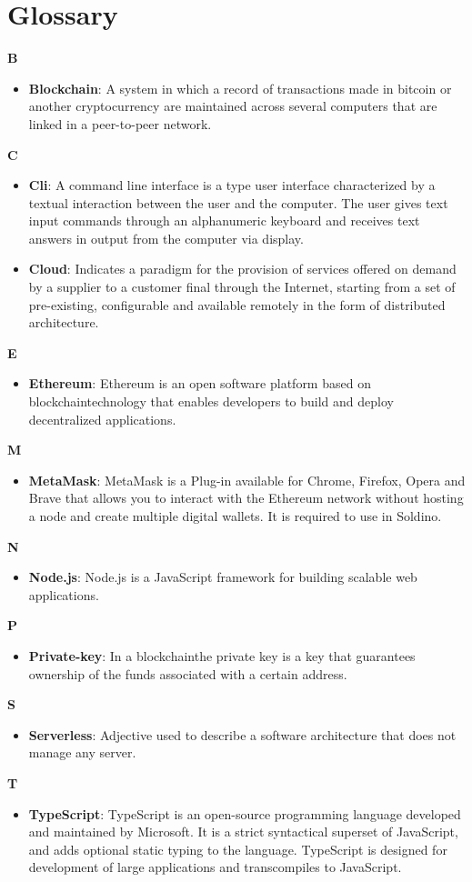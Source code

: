 \section{Glossary}
\textbf{B}
\begin{itemize}
	\item \textbf{Blockchain}: A system in which a record of transactions made in bitcoin or another cryptocurrency are maintained across several computers that are linked in a peer-to-peer network.
\end{itemize}
\textbf{C}
\begin{itemize}
	\item \textbf{Cli}: A command line interface is a type user interface characterized by a textual interaction between the user and the computer. The user gives text input commands through an alphanumeric keyboard and receives text answers in output from the computer via display.
	\item \textbf{Cloud}: Indicates a paradigm for the provision of services offered on demand by a supplier to a customer
	final through the Internet, starting from a set of pre-existing, configurable and
	available remotely in the form of distributed architecture.
\end{itemize}
\textbf{E}
\begin{itemize}
	\item \textbf{Ethereum}: Ethereum is an open software platform based on blockchain\glo technology that enables developers to build and deploy decentralized applications.
\end{itemize}
\textbf{M}
\begin{itemize}
	\item \textbf{MetaMask}: MetaMask is a Plug-in available for Chrome, Firefox, Opera and Brave that allows you to interact with the Ethereum network without hosting a node and create multiple digital wallets. It is required to use in Soldino.
\end{itemize}
\textbf{N}
\begin{itemize}
	\item \textbf{Node.js}: Node.js is a JavaScript framework for building scalable web applications.
\end{itemize}
\textbf{P}
\begin{itemize}
	\item \textbf{Private-key}: In a blockchain\glo the private key is a key that guarantees ownership of the funds associated with
	a certain address.
\end{itemize}
\textbf{S}
\begin{itemize}
	\item \textbf{Serverless}: Adjective used to describe a software architecture that does not manage any server.
\end{itemize}
\textbf{T}
\begin{itemize}
	\item \textbf{TypeScript}: TypeScript is an open-source programming language developed and maintained by Microsoft. It is a strict syntactical superset of JavaScript, and adds optional static typing to the language. TypeScript is designed for development of large applications and transcompiles to JavaScript.
\end{itemize}
